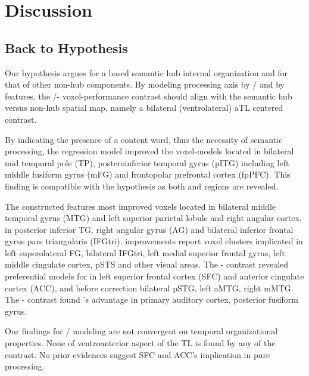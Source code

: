 \chapter{Discussion} %

\label{chap:discussions} 

\section{Back to Hypothesis}

Our hypothesis argues for a \similarity based semantic hub internal organization and \association for that of other non-hub components. By modeling \similarity processing axis by \slash {} and \association by  features, the \slash {}- voxel-performance contrast should align with the semantic hub versus non-hub spatial map, namely a bilateral (ventrolateral) aTL centered contrast. 

By indicating the presence of a content word, thus the necessity of semantic processing, the regression model improved the voxel-models located in bilateral mid temporal pole (TP), posteroinferior temporal gyrus (pITG) including left middle fusiform gyrus (mFG) and frontopolar prefrontal cortex (fpPFC). This finding is compatible with the hypothesis as both \similarity and \association regions are revealed.

The constructed  features most improved voxels located in bilateral middle temporal gyrus (MTG) and left superior parietal lobule and right angular cortex,  in posterior inferior TG, right angular gyrus (AG) and bilateral inferior frontal gyrus pars triangularis (IFGtri).  improvements report voxel clusters implicated in left superolateral FG, bilateral IFGtri, left medial superior frontal gyrus, left middle cingulate cortex, pSTS and other visual areas. The - contrast revealed preferential models for  in left superior frontal cortex (SFC) and anterior cingulate cortex (ACC), and before correction bilateral pSTG, left aMTG, right mMTG. The - contrast found 's advantage in primary auditory cortex, posterior fusiform gyrus. 

Our findings for / modeling \similarity are not convergent on temporal organizational properties. None of ventroanterior aspect of the TL is found by any of the contrast. No prior evidences suggest SFC and ACC's implication in pure \similarity processing.  

